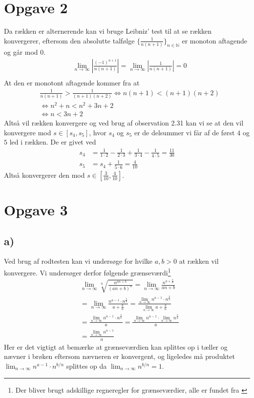 \documentclass{article}
\newcommand{\m}[1]{\mathbb{#1}}
\newcommand{\mN}{\m{N}}
\newcommand{\abs}[1]{\left| #1\right|}
\begin{document}
\section*{Opgave 2}
Da rækken er alternerende kan vi bruge Leibniz' test \cite[sætning 2.30]{an1} til at se
rækken konvergerer, eftersom den absolutte talfølge $\{\frac{1}{n(n+1)}\}_{n \in \mN}$ er monoton aftagende og går mod 0.
\begin{align*}
&\lim_{n \to \infty}\abs{\frac{(-1)^{n+1}}{n(n+1)}} = \lim_{n \to \infty} \abs{\frac{1}{n(n+1)}} = 0 \\
\end{align*}
At den er monotont aftagende kommer fra at
\begin{align*}
    &\frac{1}{n(n+1)} > \frac{1}{(n+1)(n+2)} \iff n(n+1) < (n+1)(n+2) \\
    &\iff n^2 + n < n^2 + 3n + 2 \\
    &\iff n < 3n + 2
\end{align*}
Altså vil rækken konvergere og ved brug af observation 2.31\cite{an1} kan vi se at
den vil konvergere mod $s \in [s_4, s_5]$, hvor $s_4$ og $s_5$ er de delsummer vi får
af de først $4$ og $5$ led i rækken. De er givet ved
\begin{align*}
    s_4 &= \frac{1}{1\cdot2} - \frac{1}{2\cdot3} + \frac{1}{3\cdot4} - \frac{1}{4\cdot5} = \frac{11}{30} \\
    s_5 &= s_4 + \frac{1}{5\cdot6} = \frac{4}{10}
\end{align*}
Altså konvergerer den mod $s \in [\frac{3}{10}, \frac{4}{10}]$.

\section*{Opgave 3}
\subsection*{a)}
Ved brug af rodtesten \cite[sætning 2.26]{an1} kan vi undersøge for hvilke $a,b > 0$ at rækken vil konvergere.
Vi undersøger derfor følgende grænseværdi\footnote{Der bliver brugt adskillige regneregler for grænseværdier, alle er fundet fra \cite[kapitel 2.4]{an0}}
\begin{align*}
    &\lim_{n \to \infty} \sqrt[n]{\frac{n^{an+b}}{(an+b)^n}}
    =\lim_{n \to \infty} \frac{n^{a+\frac{b}{n}}}{an+b} \\
    &=\lim_{n \to \infty} \frac{n^{a-1}\cdot n^{\frac{b}{n}}}{a+\frac{b}{n}}
    =\frac{\lim_{n \to \infty} n^{a-1}\cdot n^{\frac{b}{n}}}{\lim_{n \to \infty} a+\frac{b}{n}} \\
    &=\frac{\lim_{n \to \infty} n^{a-1}\cdot n^{\frac{b}{n}}}{a}
    =\frac{\lim_{n \to \infty} n^{a-1}\cdot \lim_{n \to \infty}n^{\frac{b}{n}}}{a} \\
    &=\frac{\lim_{n \to \infty} n^{a-1}}{a}
\end{align*}
Her er det vigtigt at bemærke at grænseværdien kan splittes op i tæller og nævner i brøken
eftersom nævneren er konvergent, og ligeledes må produktet 
$\lim_{n \to \infty} n^{a-1} \cdot n^{b/n}$ splittes op da $\lim_{n \to \infty} n^{b/n} = 1$.
\end{document}
